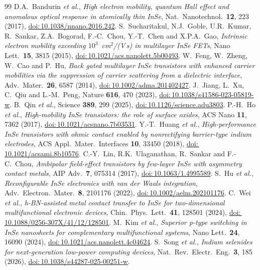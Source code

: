 \documentclass[11pt]{article}
\providecommand{\doi}[1]{\href{https://doi.org/#1}{doi:\,#1}}
\begin{document}
\begin{thebibliography}{99}
 D.A.~Bandurin \textit{et al.}, \textit{High electron mobility, quantum Hall effect and anomalous optical response in atomically thin InSe}, Nat.\ Nanotechnol.\ \textbf{12}, 223 (2017), \doi{10.1038/nnano.2016.242}.
 S.~Sucharitakul, N.J.~Goble, U.R.~Kumar, R.~Sankar, Z.A.~Bogorad, F.-C.~Chou, Y.-T.~Chen and X.P.A.~Gao, \textit{Intrinsic electron mobility exceeding $10^3$~cm$^2$/(V\,s) in multilayer InSe FETs}, Nano Lett.\ \textbf{15}, 3815 (2015), \doi{10.1021/acs.nanolett.5b00493}.
 W.~Feng, W.~Zheng, W.~Cao and P.~Hu, \textit{Back gated multilayer InSe transistors with enhanced carrier mobilities via the suppression of carrier scattering from a dielectric interface}, Adv.\ Mater.\ \textbf{26}, 6587 (2014), \doi{10.1002/adma.201402427}.
 J.~Jiang, L.~Xu, C.~Qiu and L.-M.~Peng, Nature \textbf{616}, 470 (2023), \doi{10.1038/s41586-023-05819-w}.
 B.~Qin \textit{et al.}, Science \textbf{389}, 299 (2025), \doi{10.1126/science.adu3803}.
 P.-H.~Ho \textit{et al.}, \textit{High-mobility InSe transistors: the role of surface oxides}, ACS Nano \textbf{11}, 7362 (2017), \doi{10.1021/acsnano.7b03531}.
 Y.-T.~Huang \textit{et al.}, \textit{High-performance InSe transistors with ohmic contact enabled by nonrectifying barrier-type indium electrodes}, ACS Appl.\ Mater.\ Interfaces \textbf{10}, 33450 (2018), \doi{10.1021/acsami.8b10576}.
 C.-Y.~Lin, R.K.~Ulaganathan, R.~Sankar and F.-C.~Chou, \textit{Ambipolar field-effect transistors by few-layer InSe with asymmetry contact metals}, AIP Adv.\ \textbf{7}, 075314 (2017), \doi{10.1063/1.4995589}.
 S.~Hu \textit{et al.}, \textit{Reconfigurable InSe electronics with van der Waals integration}, Adv.\ Electron.\ Mater.\ \textbf{8}, 2101176 (2022), \doi{10.1002/aelm.202101176}.
 C.~Wei \textit{et al.}, \textit{h-BN-assisted metal contact transfer to InSe for two-dimensional multifunctional electronic devices}, Chin.\ Phys.\ Lett.\ \textbf{41}, 128501 (2024), \doi{10.1088/0256-307X/41/12/128501}.
 M.~Kim \textit{et al.}, \textit{Superior p-type switching in InSe nanosheets for complementary multifunctional systems}, Nano Lett.\ \textbf{24}, 16090 (2024), \doi{10.1021/acs.nanolett.4c04624}.
 S.~Song \textit{et al.}, \textit{Indium selenides for next-generation low-power computing devices}, Nat.\ Rev.\ Electr.\ Eng.\ \textbf{3}, 185 (2026), \doi{10.1038/s44287-025-00251-w}.

\end{thebibliography}
\end{document}
